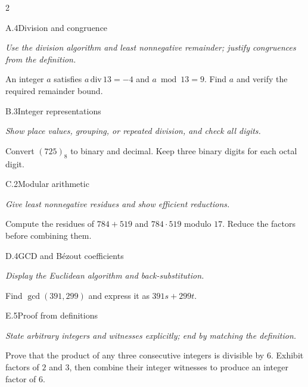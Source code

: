 \documentclass[9pt]{extarticle}
\begin{document}
\begin{multicols}{2}
\begin{CoreProblem}{A.4}{Division and congruence}
{\scriptsize\textit{Use the division algorithm and least nonnegative remainder; justify congruences from the definition.}\par}
An integer $a$ satisfies $a\,\mathrm{div}\,13=-4$ and $a\bmod13=9$.
Find $a$ and verify the required remainder bound.
\end{CoreProblem}
\begin{CoreProblem}{B.3}{Integer representations}
{\scriptsize\textit{Show place values, grouping, or repeated division, and check all digits.}\par}
Convert $(725)_8$ to binary and decimal. Keep three binary digits for each
octal digit.
\end{CoreProblem}
\begin{CoreProblem}{C.2}{Modular arithmetic}
{\scriptsize\textit{Give least nonnegative residues and show efficient reductions.}\par}
Compute the residues of $784+519$ and $784\cdot519$ modulo $17$. Reduce the
factors before combining them.
\end{CoreProblem}
\columnbreak
\begin{CoreProblem}{D.4}{GCD and B\'ezout coefficients}
{\scriptsize\textit{Display the Euclidean algorithm and back-substitution.}\par}
Find $\gcd(391,299)$ and express it as $391s+299t$.
\end{CoreProblem}
\begin{CoreProblem}{E.5}{Proof from definitions}
{\scriptsize\textit{State arbitrary integers and witnesses explicitly; end by matching the definition.}\par}
Prove that the product of any three consecutive integers is divisible by $6$.
Exhibit factors of $2$ and $3$, then combine their integer witnesses to
produce an integer factor of $6$.
\end{CoreProblem}
\end{multicols}
\CoreWorkArea
\FormBreak
{}
\end{document}
